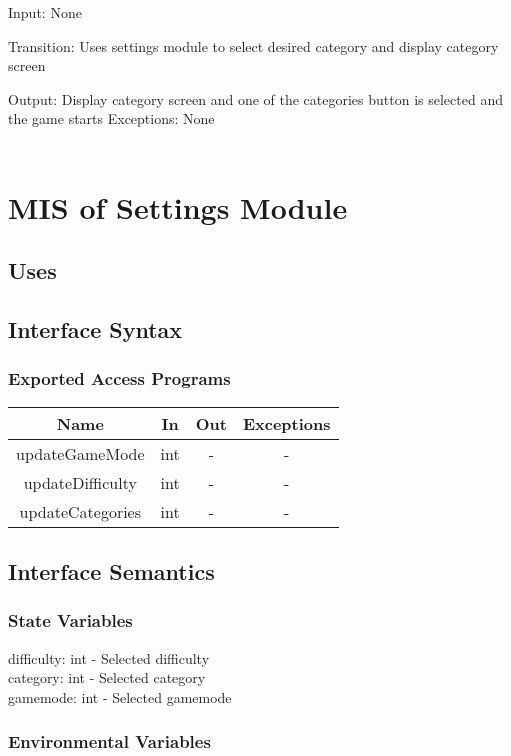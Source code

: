 \documentclass[12,english]{article}
\begin{document}
		Input: None
		
		Transition: Uses settings module to select desired category and display category screen

		Output: Display category screen and one of the categories button is selected and the game starts  
		Exceptions: None\\
		\\
\section{MIS of Settings Module}
\subsection{Uses}
		\subsection{Interface Syntax}
		\subsubsection{Exported Access Programs}
		\begin{tabular}[pos]{|c|c|c|c|}
			
			\hline
			\textbf{Name}& \textbf{In} & \textbf{Out} & \textbf{Exceptions} \\ \hline
			updateGameMode & int & - & - \\ \hline
			updateDifficulty & int & - & - \\ \hline
			updateCategories & int & - & - \\ \hline
			
		\end{tabular}
		
		\subsection{Interface Semantics}
		\subsubsection{State Variables}
		difficulty: int - Selected difficulty\\
		category: int - Selected category\\
		gamemode: int - Selected gamemode\\
		\subsubsection{Environmental Variables}
\end{document}
